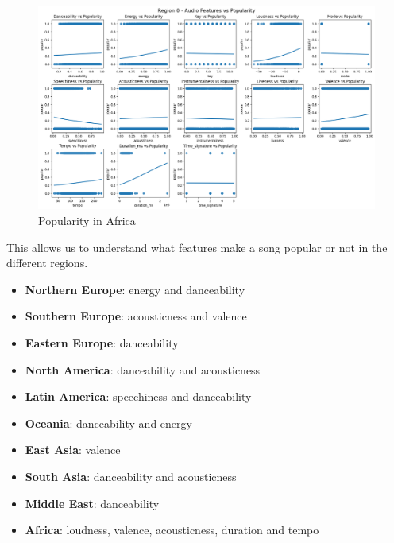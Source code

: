 \begin{figure}[h]
    \centering
    \begin{minipage}{0.45\textwidth}
        \centering
        \includegraphics[width=\linewidth]{media/region0_cleaned.png}
        \caption{Popularity in Africa}
        \label{africa}
    \end{minipage}
\end{figure}


This allows us to understand what features make a song popular or not in the different regions.

\begin{itemize}
    \item \textbf{Northern Europe}: energy and danceability
    \item \textbf{Southern Europe}: acousticness and valence
    \item \textbf{Eastern Europe}: danceability
    \item \textbf{North America}: danceability and acousticness
    \item \textbf{Latin America}: speechiness and danceability
    \item \textbf{Oceania}: danceability and energy
    \item \textbf{East Asia}: valence
    \item \textbf{South Asia}: danceability and acousticness
    \item \textbf{Middle East}: danceability
    \item \textbf{Africa}: loudness, valence, acousticness, duration and tempo
    
\end{itemize}
   

